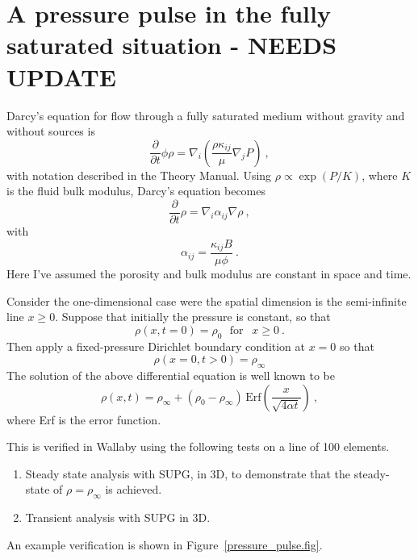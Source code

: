 \documentclass[]{scrreprt}
\begin{document}
\chapter{A pressure pulse in the fully saturated situation - NEEDS UPDATE}

Darcy's equation for flow through a fully saturated medium without
gravity and without sources is 
\begin{equation}
\frac{\partial}{\partial t}\phi\rho = \nabla_{i}\left(\frac{\rho
  \kappa_{ij}}{\mu} \nabla_{j}P \right) \ ,
\end{equation}
with notation described in the Theory Manual.  Using $\rho \propto
\exp(P/K)$, where $K$ is the fluid bulk modulus, Darcy's equation
becomes
\begin{equation}
\frac{\partial}{\partial t}\rho = \nabla_{i}\alpha_{ij}\nabla\rho \ ,
\end{equation}
with 
\begin{equation}
\alpha_{ij} = \frac{\kappa_{ij}B}{\mu\phi} \ .
\end{equation}
Here I've assumed the porosity and bulk modulus are constant in space
and time.

Consider the one-dimensional case were the spatial dimension is the
semi-infinite line $x\geq 0$.  Suppose that initially the pressure is
constant, so that
\begin{equation}
\rho(x, t=0) = \rho_{0} \ \ \ \mbox{for }\ \ x\geq 0 \ .
\end{equation}
Then apply a fixed-pressure Dirichlet boundary condition at $x=0$ so
that
\begin{equation}
\rho(x=0, t>0) = \rho_{\infty}
\end{equation}
The solution of the above differential equation is well known to be
\begin{equation}
\rho(x, t) = \rho_{\infty} + (\rho_{0} -
\rho_{\infty})\,\mbox{Erf}\left( \frac{x}{\sqrt{4\alpha t}} \right) \ ,
\label{eqn.exact.pp}
\end{equation}
where Erf is the error function.

This is verified in Wallaby using the following tests on a line of
100 elements.
\begin{enumerate}
\item Steady state analysis with SUPG, in 3D, to demonstrate that the
  steady-state of $\rho = \rho_{\infty}$ is achieved.
\item Transient analysis with SUPG in 3D.
\end{enumerate}
An example verification is shown in Figure~\ref{pressure_pulse.fig}.
\end{document}
